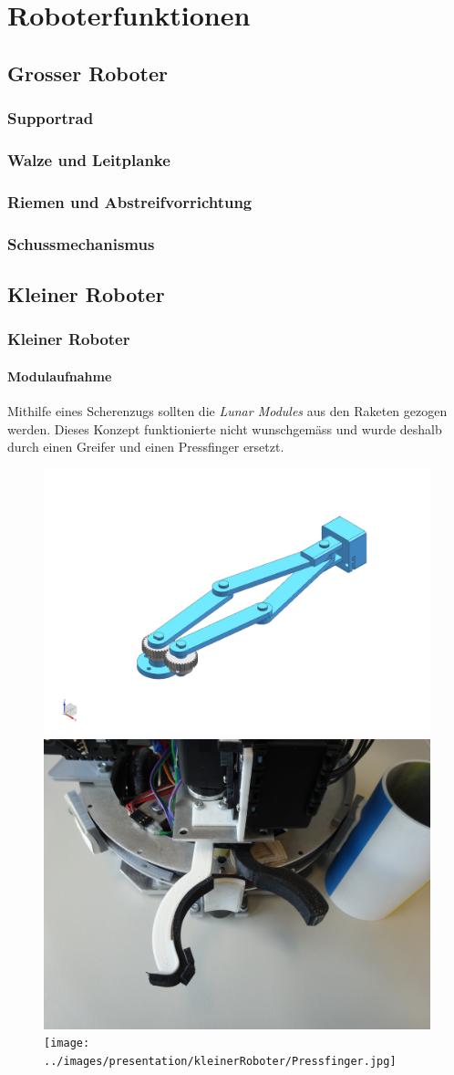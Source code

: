 \section{Roboterfunktionen}
\subsection{Grosser Roboter}

\begin{frame}
	\frametitle{Supportrad}
	
\end{frame}

\begin{frame}
	\frametitle{Walze und Leitplanke}
	
\end{frame}

\begin{frame}
	\frametitle{Riemen und Abstreifvorrichtung}
	
\end{frame}

\begin{frame}
	\frametitle{Schussmechanismus}
	
\end{frame}

\subsection{Kleiner Roboter}

\begin{frame}
	\frametitle{Kleiner Roboter}
	\framesubtitle{Modulaufnahme}
	Mithilfe eines Scherenzugs sollten die \textit{Lunar Modules} aus den Raketen gezogen werden.
	Dieses Konzept funktionierte nicht wunschgemäss und wurde deshalb durch einen Greifer und einen Pressfinger ersetzt.\\
	
	\begin{figure}
		\includegraphics[height = 3 cm]{../images/presentation/kleinerRoboter/Schere.png}
		\hspace{1em}
		\includegraphics[height = 3 cm]{../images/presentation/kleinerRoboter/Greifer.jpg}
		\hspace{2em}
		\texttt{[image: ../images/presentation/kleinerRoboter/Pressfinger.jpg]}
	\end{figure}
\end{frame}

